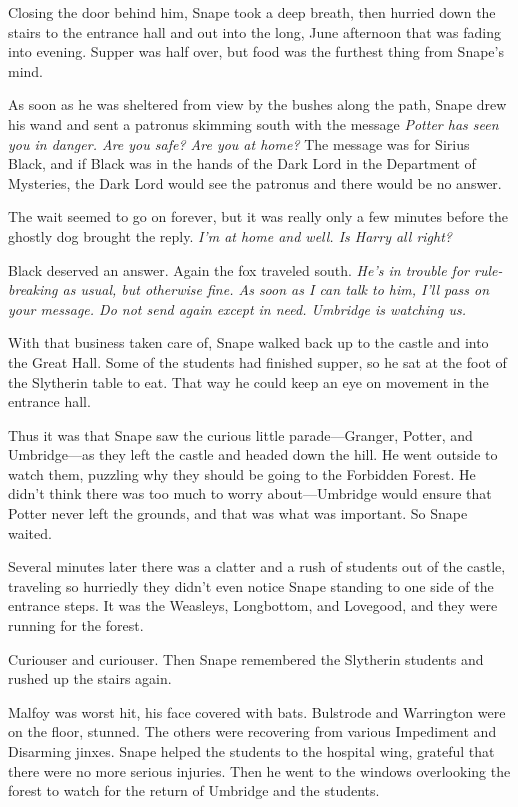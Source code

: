 Closing the door behind him, Snape took a deep breath, then hurried down the stairs to the entrance hall and out into the long, June afternoon that was fading into evening. Supper was half over, but food was the furthest thing from Snape's mind.

As soon as he was sheltered from view by the bushes along the path, Snape drew his wand and sent a patronus skimming south with the message \emph{Potter has seen you in danger. Are you safe? Are you at home?} The message was for Sirius Black, and if Black was in the hands of the Dark Lord in the Department of Mysteries, the Dark Lord would see the patronus and there would be no answer.

The wait seemed to go on forever, but it was really only a few minutes before the ghostly dog brought the reply. \emph{I'm at home and well. Is Harry all right?}

Black deserved an answer. Again the fox traveled south. \emph{He's in trouble for rule-breaking as usual, but otherwise fine. As soon as I can talk to him, I'll pass on your message. Do not send again except in need. Umbridge is watching us.}

With that business taken care of, Snape walked back up to the castle and into the Great Hall. Some of the students had finished supper, so he sat at the foot of the Slytherin table to eat. That way he could keep an eye on movement in the entrance hall.

Thus it was that Snape saw the curious little parade—Granger, Potter, and Umbridge—as they left the castle and headed down the hill. He went outside to watch them, puzzling why they should be going to the Forbidden Forest. He didn't think there was too much to worry about—Umbridge would ensure that Potter never left the grounds, and that was what was important. So Snape waited.

Several minutes later there was a clatter and a rush of students out of the castle, traveling so hurriedly they didn't even notice Snape standing to one side of the entrance steps. It was the Weasleys, Longbottom, and Lovegood, and they were running for the forest.

Curiouser and curiouser. Then Snape remembered the Slytherin students and rushed up the stairs again.

Malfoy was worst hit, his face covered with bats. Bulstrode and Warrington were on the floor, stunned. The others were recovering from various Impediment and Disarming jinxes. Snape helped the students to the hospital wing, grateful that there were no more serious injuries. Then he went to the windows overlooking the forest to watch for the return of Umbridge and the students.

